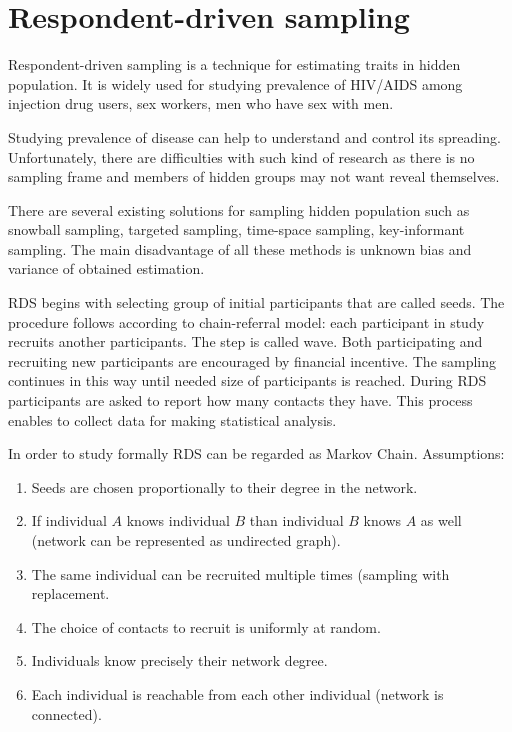 \documentclass[12pt]{report}
\begin{document}
\chapter{Respondent-driven sampling}

Respondent-driven sampling is a technique for estimating traits in hidden population. It is widely used for studying prevalence of HIV/AIDS among injection drug users, sex workers, men who have sex with men.  

Studying prevalence of disease can help to understand and control its spreading. Unfortunately, there are difficulties with such kind of research as there is no sampling frame and members of hidden groups may not want reveal themselves. 

There are several existing solutions for sampling hidden population such as snowball sampling, targeted sampling, time-space sampling, key-informant sampling. The main disadvantage of all these methods is unknown bias and variance of obtained estimation.


RDS begins with selecting group of initial participants that are called seeds. The procedure follows according to chain-referral model: each participant in study recruits another participants. The step is called wave. Both participating and recruiting new participants are encouraged by financial incentive. The sampling continues in this way until needed size of participants is reached. During RDS participants are asked to report how many contacts they have.
This process enables to collect data for making statistical analysis.

In order to study formally RDS can be regarded as Markov Chain.
Assumptions:
\begin{enumerate}
  \item Seeds are chosen proportionally to their degree in the network.  
  \item If individual $A$ knows individual $B$ than individual $B$ knows $A$ as well (network can be represented as undirected graph).
  \item The same individual can be recruited multiple times (sampling with replacement.
  \item The choice of contacts to recruit is uniformly at random.
  \item Individuals know precisely their network degree. 
  \item Each individual is reachable from each other individual (network is connected). 
\end{enumerate}
\end{document}
